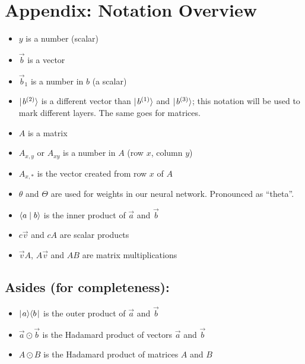\section{Appendix: Notation Overview}\label{sec:notation}
  \begin{itemize}
    \item $y$ is a number (scalar)
    \item $\vec{b}$ is a vector
    \item $\vec{b}_1$ is a number in $b$ (a scalar)
    \item $\mid\! b^{(2)}\rangle$ is a different vector than $\mid\! b^{(1)}\rangle$ and $\mid\! b^{(3)}\rangle$; this notation will be used to mark different layers. The same goes for matrices.
    \item $A$ is a matrix
    \item $A_{x,y}$ or $A_{xy}$ is a number in $A$ (row $x$, column $y$)
    \item $A_{x,*}$ is the vector created from row $x$ of $A$
    \item $\theta$ and $\Theta$ are used for weights in our neural network. Pronounced as \enquote{theta}.
    \item $\langle a \mid b \rangle$ is the inner product of $\vec a$ and $\vec b$
    \item $c\vec{v}$ and $cA$ are scalar products
    \item $\vec{v}A$, $A\vec{v}$ and $AB$ are matrix multiplications
  \end{itemize}

\subsection{Asides (for completeness):}
  \begin{itemize}
    \item $\mid\! a \rangle \langle b \!\mid$ is the outer product of $\vec a$ and $\vec b$
    \item $\vec a \odot \vec b$ is the Hadamard product of vectors $\vec a$ and $\vec b$
    \item $A \odot B$ is the Hadamard product of matrices $A$ and $B$
  \end{itemize}
